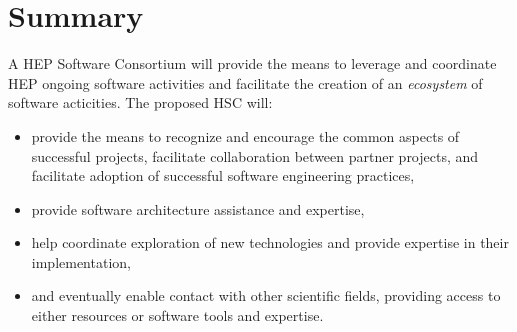 \documentclass[12pt,letterpaper,fleqn]{article}
\begin{document}
\section{Summary} 


A HEP Software Consortium will provide the means to leverage and
coordinate HEP ongoing software activities and facilitate the creation of an {\it ecosystem} of
software acticities.   The proposed HSC will:
\begin{itemize}

\item provide the means to recognize and encourage the common aspects
of successful projects, facilitate collaboration between partner
projects, and facilitate adoption of successful software engineering
practices,
\item provide software architecture assistance and expertise,
\item help coordinate exploration of new technologies and provide expertise in their implementation,
\item and eventually enable contact with other scientific fields,
providing access to either resources or software tools and expertise.
\end{itemize}



\newpage

%
%
\end{document}
